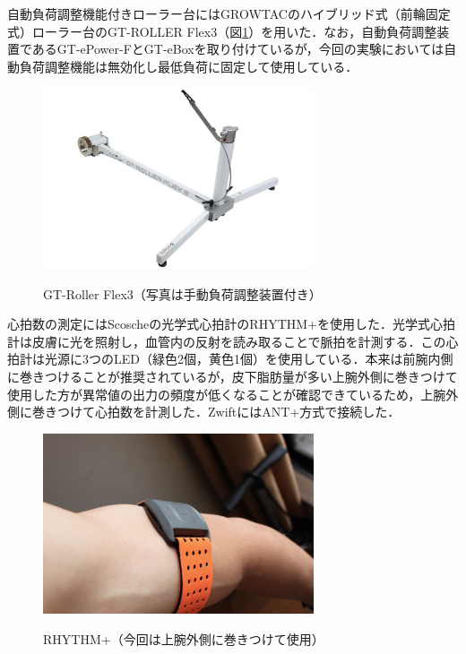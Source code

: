 自動負荷調整機能付きローラー台にはGROWTACのハイブリッド式（前輪固定式）ローラー台のGT-ROLLER Flex3（図\ref{fig:gt-roller_flex3}）を用いた．なお，自動負荷調整装置であるGT-ePower-FとGT-eBoxを取り付けているが，今回の実験においては自動負荷調整機能は無効化し最低負荷に固定して使用している．

\begin{figure}[H]
  \begin{center}
    \label{fig:gt-roller_flex3}
    \includegraphics[width=8cm]{fig/gt-roller_flex3}
    \caption{GT-Roller Flex3（写真は手動負荷調整装置付き）}
  \end{center}
\end{figure}

心拍数の測定にはScoscheの光学式心拍計のRHYTHM+を使用した．光学式心拍計は皮膚に光を照射し，血管内の反射を読み取ることで脈拍を計測する．この心拍計は光源に3つのLED（緑色2個，黄色1個）を使用している．本来は前腕内側に巻きつけることが推奨されているが，皮下脂肪量が多い上腕外側に巻きつけて使用した方が異常値の出力の頻度が低くなることが確認できているため，上腕外側に巻きつけて心拍数を計測した．ZwiftにはANT+方式で接続した．

\begin{figure}[H]
  \begin{center}
    \label{fig:rhythm}
    \includegraphics[width=8cm]{fig/rhythm}
    \caption{RHYTHM+（今回は上腕外側に巻きつけて使用）}
  \end{center}
\end{figure}


